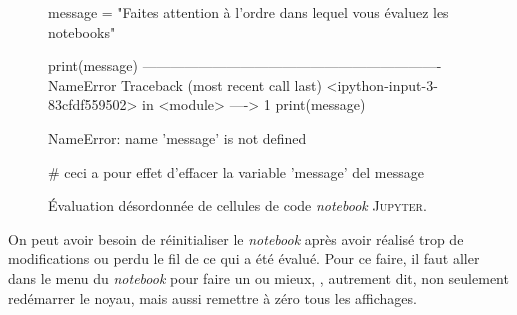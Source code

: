 \begin{figure}
\begin{nbjupyterin}{1}
message = "Faites attention à l'ordre dans lequel vous évaluez les notebooks"
\end{nbjupyterin}
\vspace*{1pt}
\begin{nbjupyterin}{3}
print(message)
----------------------------------------------------------------
NameError                      Traceback (most recent call last)
<ipython-input-3-83cfdf559502> in <module>
----> 1 print(message)

NameError: name 'message' is not defined
\end{nbjupyterin}
\vspace*{1pt}
\begin{nbjupyterin}{2}
# ceci a pour effet d'effacer la variable 'message'
del message
\end{nbjupyterin}
\caption{\label{fig:X.5}Évaluation désordonnée de cellules de code \emph{notebook} \textsc{Jupyter}.}
\vspace{-\baselineskip}
\end{figure}

On peut avoir besoin de réinitialiser le \textit{notebook} après avoir réalisé trop de modifications ou perdu le fil de ce qui a été évalué. Pour ce faire, il faut aller dans le menu du \textit{notebook} pour faire un  ou mieux, , autre\-ment dit, non seulement redémarrer le noyau, mais aussi remettre à zéro tous les affichages.

